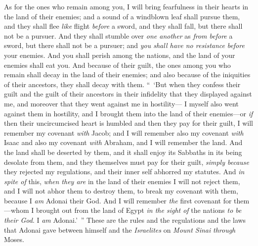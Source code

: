 \begin{biblechapter}
\verse As for the ones who remain among you, I will bring fearfulness in their hearts in the land of their enemies; and a sound of a windblown leaf shall pursue them, and they shall flee \textit{like} flight \textit{before} a sword, and they shall fall, but there shall not be a pursuer.
\verse And they shall stumble over \textit{one another} as \textit{from before} a sword, but there shall not be a pursuer; and \textit{you shall have no resistance} \textit{before} your enemies.
\verse And you shall perish among the nations, and the land of your enemies shall eat you.
\verse And because of their guilt, the ones among you who remain shall decay in the land of their enemies; and also because of the iniquities of their ancestors, they shall decay with them.
\verse “ ‘But when they confess their guilt and the guilt of their ancestors in their infidelity that they displayed against me, and moreover that they went against me in hostility—
\verse I myself also went against them in hostility, and I brought them into the land of their enemies—or \textit{if} then their uncircumcised heart is humbled and then they pay for their guilt,
\verse I will remember my covenant \textit{with} Jacob; and I will remember also my covenant \textit{with} Isaac and also my covenant \textit{with} Abraham, and I will remember the land.
\verse And the land shall be deserted by them, and it shall enjoy its Sabbaths in its being desolate from them, and they themselves must pay for their guilt, \textit{simply because} they rejected my regulations, and their inner self abhorred my statutes.
\verse And \textit{in spite of} this, \textit{when they are} in the land of their enemies I will not reject them, and I will not abhor them to destroy them, to break my covenant with them, because I \textit{am} Adonai their God.
\verse And I will remember \textit{the} first covenant for them—whom I brought out from the land of Egypt \textit{in the sight of} the nations \textit{to be their God}. I \textit{am} Adonai.’ ”
\verse These are the rules and the regulations and the laws that Adonai gave between himself and the \textit{Israelites} on \textit{Mount Sinai} \textit{through} Moses.
\end{biblechapter}

